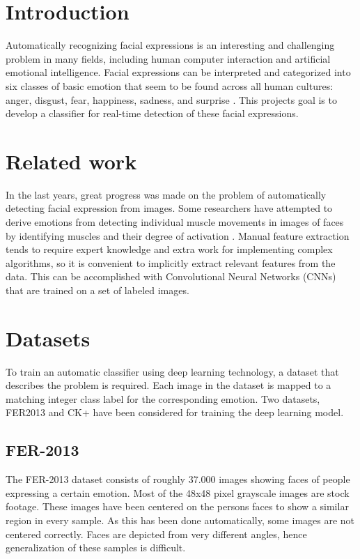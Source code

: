 \documentclass[twoside]{article}
\begin{document}
\begin{multicols}{2} %

\section{Introduction}

Automatically recognizing facial expressions is an interesting and challenging problem in many fields, including human computer interaction and artificial emotional intelligence. Facial expressions can be interpreted and categorized into six classes of basic emotion that seem to be found across all human cultures: anger, disgust, fear, happiness, sadness, and surprise \cite{ekman93}. This projects goal is to develop a classifier for real-time detection of these facial expressions.


\section{Related work}
In the last years, great progress was made on the problem of automatically detecting facial expression from images. Some researchers have attempted to derive emotions from detecting individual muscle movements in images of faces by identifying muscles and their degree of activation \cite{lien98}. Manual feature extraction tends to require expert knowledge and extra work for implementing complex algorithms, so it is convenient to implicitly extract relevant features from the data. This can be accomplished with Convolutional Neural Networks (CNNs) that are trained on a set of labeled images.


\section{Datasets}
To train an automatic classifier using deep learning technology, a dataset that describes the problem is required. Each image in the dataset is mapped to a matching integer class label for the corresponding emotion. Two datasets, FER2013 \cite{goodfel13} and CK+ \cite{cohn00} have been considered for training the deep learning model.

\subsection{FER-2013}
The FER-2013 dataset consists of roughly 37.000 images showing faces of people expressing a certain emotion. Most of the 48x48 pixel grayscale images are stock footage. These images have been centered on the persons faces to show a similar region in every sample. As this has been done automatically, some images are not centered correctly. Faces are depicted from very different angles, hence generalization of these samples is difficult. 


\end{multicols}
\end{document}
